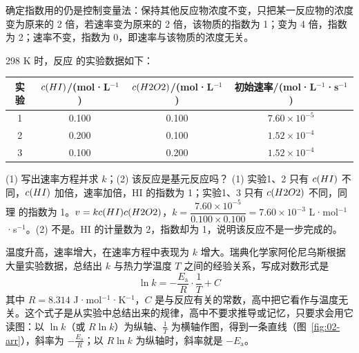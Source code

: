 确定指数用的仍是控制变量法：保持其他反应物浓度不变，只把某一反应物的浓度变为原来的 2 倍，若速率变为原来的 2 倍，该物质的指数为 1；变为 4 倍，指数为 2；速率不变，指数为 0，即速率与该物质的浓度无关。

\begin{liti}[基础]
298 K 时，反应  的实验数据如下：
\begin{center}\small
\begin{tabular}{cccc}
\toprule
实验 & $c(HI)$/(mol·L$^{-1}$) & $c(H2O2)$/(mol·L$^{-1}$) & 初始速率/(mol·L$^{-1}$·s$^{-1}$) \\
\midrule
1 & 0.100 & 0.100 & $7.60\times10^{-5}$ \\
2 & 0.200 & 0.100 & $1.52\times10^{-4}$ \\
3 & 0.100 & 0.200 & $1.52\times10^{-4}$ \\
\bottomrule
\end{tabular}
\end{center}
(1) 写出速率方程并求 $k$；(2) 该反应是基元反应吗？
\tcblower
\jie (1) 实验1、2 只有 $c(HI)$ 不同，$c(HI)$ 加倍，速率加倍，HI 的指数为 1；实验1、3 只有 $c(H2O2)$ 不同，同理  的指数为 1。$v=kc(HI)c(H2O2)$，$k=\dfrac{7.60\times10^{-5}}{0.100\times0.100}=7.60\times10^{-3}$ L·mol$^{-1}$·s$^{-1}$。(2) 不是。HI 的计量数为 2，指数却为 1，说明该反应不是一步完成的。
\end{liti}

温度升高，速率增大，在速率方程中表现为 $k$ 增大。瑞典化学家阿伦尼乌斯根据大量实验数据，总结出 $k$ 与热力学温度 $T$ 之间的经验关系，写成对数形式是
\[\ln k=-\frac{E_\text{a}}{R}\cdot\frac1T+C\]
其中 $R=8.314$ J·mol$^{-1}$·K$^{-1}$，$C$ 是与反应有关的常数，高中把它看作与温度无关。这个式子是从实验中总结出来的规律，高中不要求推导或记忆，只要求会用它读图：以 $\ln k$（或 $R\ln k$）为纵轴、$\frac1T$ 为横轴作图，得到一条直线（图~\ref{fig:02-arr}），斜率为 $-\frac{E_\text{a}}{R}$；以 $R\ln k$ 为纵轴时，斜率就是 $-E_\text{a}$。


